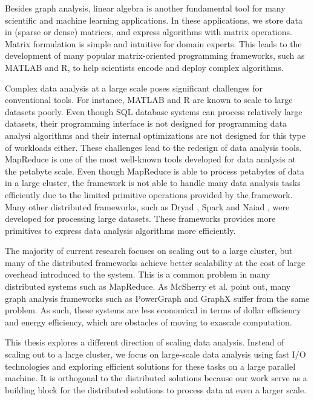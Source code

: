 Besides graph analysis, linear algebra is another fundamental tool for many
scientific and machine learning applications. In these applications, we store
data in (sparse or dense) matrices, and express algorithms with matrix
operations. Matrix formulation is simple and intuitive for domain experts.
This leads to the development of many popular matrix-oriented programming
frameworks, such as MATLAB and R, to help scientists encode and deploy complex
algorithms.

Complex data analysis at a large scale poses significant challenges for
conventional tools. For instance, MATLAB and R are known to scale to large
datasets poorly. Even though SQL database systems can process relatively large
datasets, their programming interface is not designed for programming data
analysi algorithms and their internal optimizations are not designed for this
type of workloads either.
These challenges lead to the redesign of data analysis tools.
MapReduce \cite{mapreduce} is one of the most well-known tools developed for
data analysis at the petabyte scale. Even though MapReduce is able to
process petabytes of data in a large cluster, the framework is not able to
handle many data analysis tasks efficiently due to the limited primitive
operations provided by the framework. Many other distributed frameworks,
such as Dryad \cite{dryad}, Spark \cite{spark} and Naiad \cite{naiad}, were
developed for processing large datasets. These frameworks provides
more primitives to express data analysis algorithms more efficiently.

The majority of current research focuses on scaling out to a large cluster,
but many of the distributed frameworks achieve better scalability at the cost
of large overhead introduced to the system. This is a common problem in many
distributed systems such as MapReduce. As McSherry et al. \cite{mcsherry15}
point out, many graph analysis frameworks such as PowerGraph \cite{powergraph}
and GraphX \cite{graphx} suffer from the same problem. As such, these systems
are less economical in terms of dollar efficiency and energy efficiency, which
are obstacles of moving to exascale computation.

This thesis explores a different direction of scaling data analysis. Instead
of scaling out to a large cluster, we focus on large-scale data analysis
using fast I/O technologies and exploring efficient solutions for these tasks
on a large parallel machine. It is orthogonal to the distributed solutions
because our work serve as a building block for the distributed solutions to
process data at even a larger scale.


